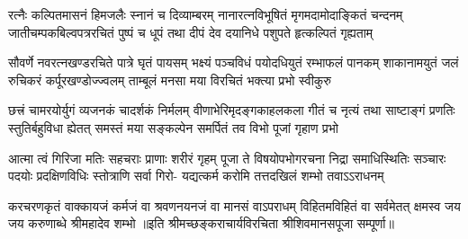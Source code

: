 
\fourlineindentedshloka
{रत्नैः कल्पितमासनं हिमजलैः स्नानं च दिव्याम्बरम्}
{नानारत्नविभूषितं मृगमदामोदाङ्कितं चन्दनम्}
{जातीचम्पकबिल्वपत्ररचितं पुष्पं च धूपं तथा}
{दीपं देव दयानिधे पशुपते हृत्कल्पितं गृह्यताम्}

\fourlineindentedshloka
{सौवर्णे नवरत्नखण्डरचिते पात्रे घृतं पायसम्}
{भक्ष्यं पञ्चविधं पयोदधियुतं रम्भाफलं पानकम्}
{शाकानामयुतं जलं रुचिकरं कर्पूरखण्डोज्ज्वलम्}
{ताम्बूलं मनसा मया विरचितं भक्त्या प्रभो स्वीकुरु}

\fourlineindentedshloka
{छत्त्रं चामरयोर्युगं व्यजनकं चादर्शकं निर्मलम्}
{वीणाभेरिमृदङ्गकाहलकला गीतं च नृत्यं तथा}
{साष्टाङ्गं प्रणतिः स्तुतिर्बहुविधा ह्येतत् समस्तं मया}
{सङ्कल्पेन समर्पितं तव विभो पूजां गृहाण प्रभो}

\fourlineindentedshloka
{आत्मा त्वं गिरिजा मतिः सहचराः प्राणाः शरीरं गृहम्}
{पूजा ते विषयोपभोगरचना निद्रा समाधिस्थितिः}
{सञ्चारः पदयोः प्रदक्षिणविधिः स्तोत्राणि सर्वा गिरो-}
{यद्यत्कर्म करोमि तत्तदखिलं शम्भो तवाऽऽराधनम्}

\fourlineindentedshloka
{करचरणकृतं वाक्कायजं कर्मजं वा}
{श्रवणनयनजं वा मानसं वाऽपराधम्}
{विहितमविहितं वा सर्वमेतत् क्षमस्व}
{जय जय करुणाब्धे श्रीमहादेव शम्भो}
॥इति श्रीमच्छङ्कराचार्यविरचिता श्रीशिवमानसपूजा सम्पूर्णा॥